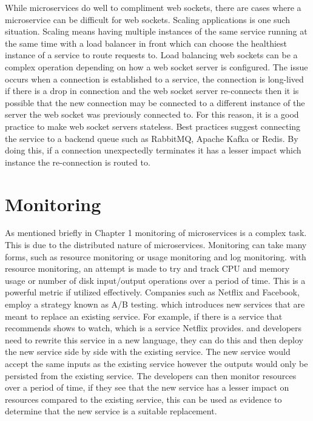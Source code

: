 While microservices do well to compliment web sockets, there are cases where a microservice can be difficult for web sockets. Scaling applications is one such situation. Scaling means having multiple instances of the same service running at the same time with a load balancer in front which can choose the healthiest instance of a service to route requests to. Load balancing web sockets can be a complex operation depending on how a web socket server is configured. The issue occurs when a connection is established to a service, the connection is long-lived if there is a drop in connection and the web socket server re-connects then it is possible that the new connection may be connected to a different instance of the server the web socket was previously connected to. For this reason, it is a good practice to make web socket servers stateless. Best practices suggest connecting the service to a backend queue such as RabbitMQ, Apache Kafka or Redis. By doing this, if a connection unexpectedly terminates it has a lesser impact which instance the re-connection is routed to.

\section{Monitoring}

As mentioned briefly in Chapter 1 monitoring of microservices is a complex task. This is due to the distributed nature of microservices. Monitoring can take many forms, such as resource monitoring or usage monitoring and log monitoring. with resource monitoring, an attempt is made to try and track CPU and memory usage or number of disk input/output operations over a period of time. This is a powerful metric if utilized effectively. Companies such as Netflix and Facebook, employ a strategy known as A/B testing. which introduces new services that are meant to replace an existing service. For example, if there is a service that recommends shows to watch, which is a service Netflix provides. and developers need to rewrite this service in a new language, they can do this and then deploy the new service side by side with the existing service. The new service would accept the same inputs as the existing service however the outputs would only be persisted from the existing service. The developers can then monitor resources over a period of time, if they see that the new service has a lesser impact on resources compared to the existing service, this can be used as evidence to determine that the new service is a suitable replacement.

